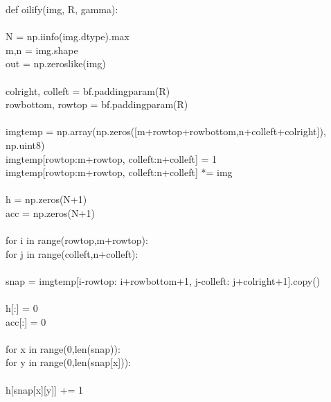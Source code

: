 \documentclass{article}
\begin{document}
	\noindent def oilify(img, R, gamma):\\
	\\
	\indent N = np.iinfo(img.dtype).max\\
	\indent m,n = img.shape\\
	\indent out = np.zeros\textunderscore like(img)\\
	\\
	\indent col\textunderscore right, col\textunderscore left = bf.padding\textunderscore param(R)\\
	\indent row\textunderscore bottom, row\textunderscore top = bf.padding\textunderscore param(R)\\
	\\
	\indent img\textunderscore temp = np.array(np.zeros([m+row\textunderscore top+row\textunderscore bottom,n+col\textunderscore left+col\textunderscore right]), np.uint8)\\
	\indent img\textunderscore temp[row\textunderscore top:m+row\textunderscore top, col\textunderscore left:n+col\textunderscore left] = 1\\
	\indent img\textunderscore temp[row\textunderscore top:m+row\textunderscore top, col\textunderscore left:n+col\textunderscore left] *= img\\
	\\
	\indent h = np.zeros(N+1)\\
	\indent acc = np.zeros(N+1)\\
	\\
	\indent for i in range(row\textunderscore top,m+row\textunderscore top):\\
	\indent \indent for j in range(col\textunderscore left,n+col\textunderscore left):\\
	\\
	\indent \indent \indent snap = img\textunderscore temp[i-row\textunderscore top: i+row\textunderscore bottom+1, j-col\textunderscore left: j+col\textunderscore right+1].copy()\\
	\\
	\indent \indent \indent h[:] = 0\\
	\indent \indent \indent acc[:] = 0\\
	\\
	\indent \indent \indent for x in range(0,len(snap)):\\
	\indent \indent \indent \indent for y in range(0,len(snap[x])):\\
	\\
	\indent \indent \indent \indent \indent h[snap[x][y]] += 1\\
\end{document}
